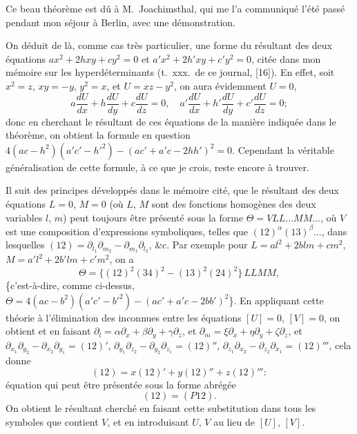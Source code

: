 \documentclass[11pt]{article}
\begin{document}
\medskip
Ce beau th\'eor\`eme est d\^u \`a M.~Joachimsthal, qui me l'a communiqu\'e l'\'et\'e pass\'e
pendant mon s\'ejour \`a Berlin, avec une d\'emonstration.

\medskip
On d\'eduit de l\`a, comme cas tr\`es particulier, une forme du r\'esultant des deux
\'equations $a x^{2} + 2 h x y + c y^{2} = 0$ et $a' x^{2} + 2 h' x y + c' y^{2} = 0$, cit\'ee dans mon m\'emoire sur les
hyperd\'eterminants (t.~xxx.\ de ce journal, [16]). En effet, soit $x^{2} = z$, $x y = -y$, $y^{2} = x$, et
$U = x z - y^{2}$, on aura \'evidemment $U = 0$,
\[
a\frac{dU}{dx} + h\frac{dU}{dy} + c\frac{dU}{dz} = 0, \quad a'\frac{dU}{dx} + h'\frac{dU}{dy} + c'\frac{dU}{dz} = 0;
\]
donc en cherchant le r\'esultant de ces \'equations de la mani\`ere indiqu\'ee dans le th\'eor\`eme,
on obtient la formule en question $4(a c - h^{2})(a' c' - h'^{2}) - (a c' + a' c - 2 h h')^{2} = 0$. Cependant la
v\'eritable g\'en\'eralisation de cette formule, \`a ce que je crois, reste encore \`a trouver.

\medskip
Il suit des principes d\'evelopp\'es dans le m\'emoire cit\'e, que le r\'esultant des deux
\'equations $L = 0$, $M = 0$ (o\`u $L$, $M$ sont des fonctions homog\`enes des deux variables $l$, $m$)
peut toujours \^etre pr\'esent\'e sous la forme $\Theta = V L L \ldots M M \ldots$, o\`u $V$ est une composition
d'expressions symboliques, telles que $(12)^{\alpha}(13)^{\beta}\ldots$, dans lesquelles $(12) = \partial_{l_{1}} \partial_{m_{2}} - \partial_{m_{1}} \partial_{l_{2}}$,
\&c. Par exemple pour $L = a l^{2} + 2 b l m + c m^{2}$, $M = a' l^{2} + 2 b' l m + c' m^{2}$, on a
\[
\Theta = \{(12)^{2}(34)^{2} - (13)^{2}(24)^{2}\}\,L L M M,
\]
\{c'est-\`a-dire, comme ci-dessus, $\Theta = 4(a c - b^{2})(a' c' - b'^{2}) - (a c' + a' c - 2 b b')^{2}$\}. En appliquant
cette th\'eorie \`a l'\'elimination des inconnues entre les \'equations $[U] = 0$, $[V] = 0$, on obtient
\medskip
et en faisant $\partial_{l} = \alpha \partial_{x} + \beta \partial_{y} + \gamma \partial_{z}$, et $\partial_{m} = \xi \partial_{x} + \eta \partial_{y} + \zeta \partial_{z}$,
\medskip
et $\partial_{x_{1}} \partial_{y_{2}} - \partial_{x_{2}} \partial_{y_{1}} = (12)'$, $\partial_{y_{1}} \partial_{z_{2}} - \partial_{y_{2}} \partial_{z_{1}} = (12)''$, $\partial_{z_{1}} \partial_{x_{2}} - \partial_{z_{2}} \partial_{x_{1}} = (12)'''$,
cela donne
\[
(12) = x(12)' + y(12)'' + z(12)''':
\]
\'equation qui peut \^etre pr\'esent\'ee sous la forme abr\'eg\'ee
\[
(12) = (P 1 2).
\]
On obtient le r\'esultant cherch\'e en faisant cette substitution dans tous les symboles
que contient $V$, et en introduisant $U$, $V$ au lieu de $[U]$, $[V]$.
\end{document}
